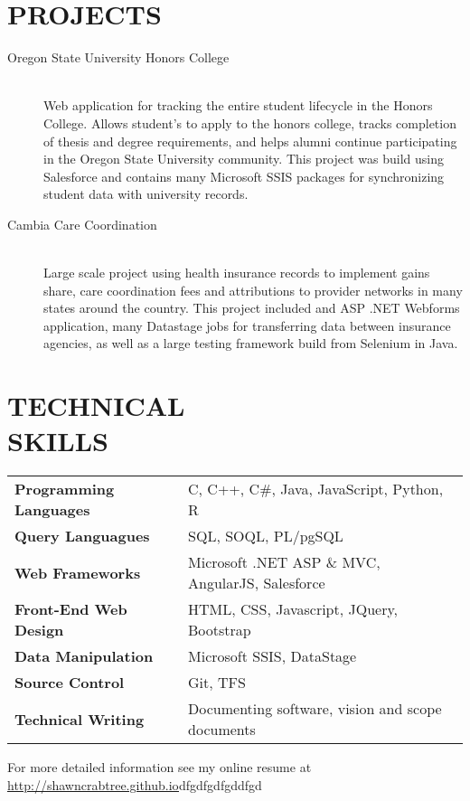\documentclass[margin]{res}
\newenvironment{bottompar}{\par\vspace*{\fill}}{\clearpage}
\begin{document}
\begin{resume}
 
\section{PROJECTS} 
                \begin{description}
                  \item[Oregon State University Honors College] \hfill \\
                  Web application for tracking the entire student lifecycle in the Honors College. Allows student's to apply to the honors college, tracks completion of thesis and degree requirements, and helps alumni continue participating in the  Oregon State University community. This project was build using Salesforce and contains many Microsoft SSIS packages for synchronizing student data with university records. 
                  \item[Cambia Care Coordination] \hfill \\
                  Large scale project using health insurance records to implement gains share, care coordination fees and attributions to provider networks in many states around the country. This project included and ASP .NET Webforms application, many Datastage jobs for transferring data between insurance agencies, as well as a large testing framework build from Selenium in Java. 
                \end{description}
             
\section{TECHNICAL \\ SKILLS} 

\begin{tabular}{ l l }
 \textbf{Programming Languages} & C, C++, C\#, Java, JavaScript, Python, R  \\
 \textbf{Query Languagues} & SQL, SOQL, PL/pgSQL   \\
 \textbf{Web Frameworks} & Microsoft .NET ASP \& MVC, AngularJS, Salesforce   \\
 \textbf{Front-End Web Design} & HTML, CSS, Javascript, JQuery, Bootstrap  \\
 \textbf{Data Manipulation} & Microsoft SSIS, DataStage  \\
 \textbf{Source Control} & Git, TFS \\   
 \textbf{Technical Writing} & Documenting software, vision and scope documents\\
\end{tabular}
\end{resume}

\begin{flushleft}
\begin{bottompar}
For more detailed information see my online resume at \href{http://shawncrabtree.github.io}{http://shawncrabtree.github.io}dfgdfgdfgddfgd
\end{bottompar}
\end{flushleft}
\end{document}
